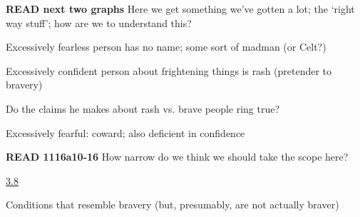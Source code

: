 \documentclass[11pt]{article}
\begin{document}
\noindent\textbf{READ next two graphs} Here we get something we've gotten a lot; the `right way stuff'; how are we to understand this?
\vspace*{2mm}

\noindent Excessively fearless person has no name; some sort of madman (or Celt?)
\vspace*{2mm}

\noindent Excessively confident person about frightening things is rash (pretender to bravery)
\vspace*{2mm}

\noindent Do the claims he makes about rash vs. brave people ring true?
\vspace*{2mm}

\noindent Excessively fearful: coward; also deficient in confidence
\vspace*{2mm}

\noindent\textbf{READ 1116a10-16} How narrow do we think we should take the scope here?
\vspace*{4mm}

\noindent\underline{3.8}
\vspace*{4mm}

\noindent Conditions that resemble bravery (but, presumably, are not actually braver)
\end{document}
